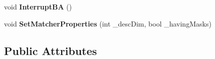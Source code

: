 \begin{DoxyCompactItemize}
\item 
void {\bfseries Interrupt\+BA} ()\hypertarget{classMultiColSLAM_1_1cLocalMapping_a38f56613460e0373bc240861deee291f}{}\label{classMultiColSLAM_1_1cLocalMapping_a38f56613460e0373bc240861deee291f}

\item 
void {\bfseries Set\+Matcher\+Properties} (int \+\_\+desc\+Dim, bool \+\_\+having\+Masks)\hypertarget{classMultiColSLAM_1_1cLocalMapping_a06e4cdc5af150689bad87229ac4b1c99}{}\label{classMultiColSLAM_1_1cLocalMapping_a06e4cdc5af150689bad87229ac4b1c99}

\end{DoxyCompactItemize}
\subsection*{Public Attributes}
